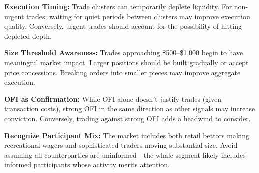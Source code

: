\textbf{Execution Timing:} Trade clusters can temporarily deplete liquidity. For non-urgent trades, waiting for quiet periods between clusters may improve execution quality. Conversely, urgent trades should account for the possibility of hitting depleted depth.

\textbf{Size Threshold Awareness:} Trades approaching \$500--\$1,000 begin to have meaningful market impact. Larger positions should be built gradually or accept price concessions. Breaking orders into smaller pieces may improve aggregate execution.

\textbf{OFI as Confirmation:} While OFI alone doesn't justify trades (given transaction costs), strong OFI in the same direction as other signals may increase conviction. Conversely, trading against strong OFI adds a headwind to consider.

\textbf{Recognize Participant Mix:} The market includes both retail bettors making recreational wagers and sophisticated traders moving substantial size. Avoid assuming all counterparties are uninformed---the whale segment likely includes informed participants whose activity merits attention.
